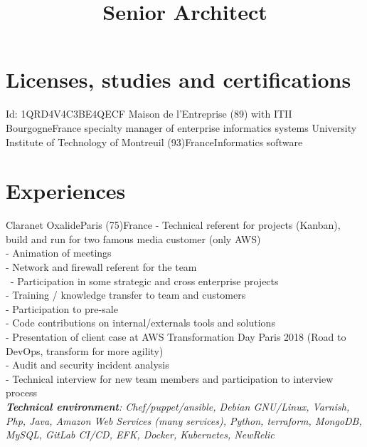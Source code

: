 \documentclass[10pt,a4paper]{moderncv}
\title{Senior Architect}
\begin{document}
\maketitle

\section{Licenses, studies and certifications}
{Id: 1QRD4V4C3BE4QECF}{}{}
{Maison de l'Entreprise (89) with ITII Bourgogne}{France}{}
{specialty manager of enterprise informatics systems}
{University Institute of Technology of Montreuil (93)}{France}{}{Informatics software}

\section{Experiences}
{Claranet Oxalide}{Paris (75)}{France}
{
- Technical referent for projects (Kanban), build and run for two famous media customer (only AWS)\\
- Animation of meetings\\
- Network and firewall referent for the team\\\
- Participation in some strategic and cross enterprise projects\\
- Training / knowledge transfer to team and customers\\
- Participation to pre-sale\\
- Code contributions on internal/externals tools and solutions\\
- Presentation of client case at AWS Transformation Day Paris 2018 (Road to DevOps, transform for more agility)\\
- Audit and security incident analysis\\
- Technical interview for new team members and participation to interview process\\
\newline{}
\textit{\textbf{Technical environment}: Chef/puppet/ansible, Debian GNU/Linux, Varnish, Php, Java, Amazon Web Services (many services), Python, terraform, MongoDB, MySQL, GitLab CI/CD, EFK, Docker, Kubernetes, NewRelic}
\newline{}
}
\end{document}
